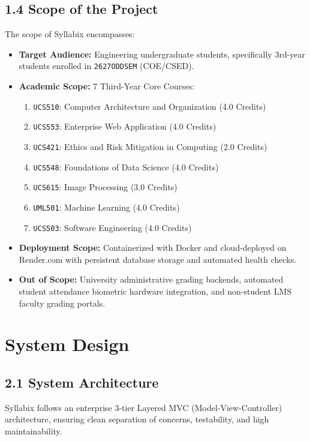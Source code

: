 \documentclass[12pt,a4paper]{report}
\begin{document}
\section{1.4 Scope of the Project}
The scope of Syllabix encompasses:
\begin{itemize}
    \item \textbf{Target Audience:} Engineering undergraduate students, specifically 3rd-year students enrolled in \texttt{2627ODDSEM} (COE/CSED).
    \item \textbf{Academic Scope:} 7 Third-Year Core Courses:
    \begin{enumerate}
        \item \texttt{UCS510}: Computer Architecture and Organization (4.0 Credits)
        \item \texttt{UCS553}: Enterprise Web Application (4.0 Credits)
        \item \texttt{UCS421}: Ethics and Risk Mitigation in Computing (2.0 Credits)
        \item \texttt{UCS548}: Foundations of Data Science (4.0 Credits)
        \item \texttt{UCS615}: Image Processing (3.0 Credits)
        \item \texttt{UML501}: Machine Learning (4.0 Credits)
        \item \texttt{UCS503}: Software Engineering (4.0 Credits)
    \end{enumerate}
    \item \textbf{Deployment Scope:} Containerized with Docker and cloud-deployed on Render.com with persistent database storage and automated health checks.
    \item \textbf{Out of Scope:} University administrative grading backends, automated student attendance biometric hardware integration, and non-student LMS faculty grading portals.
\end{itemize}

\newpage
\chapter{\color{ThaparCrimson} System Design}

\section{2.1 System Architecture}
Syllabix follows an enterprise 3-tier Layered MVC (Model-View-Controller) architecture, ensuring clean separation of concerns, testability, and high maintainability.
\end{document}
